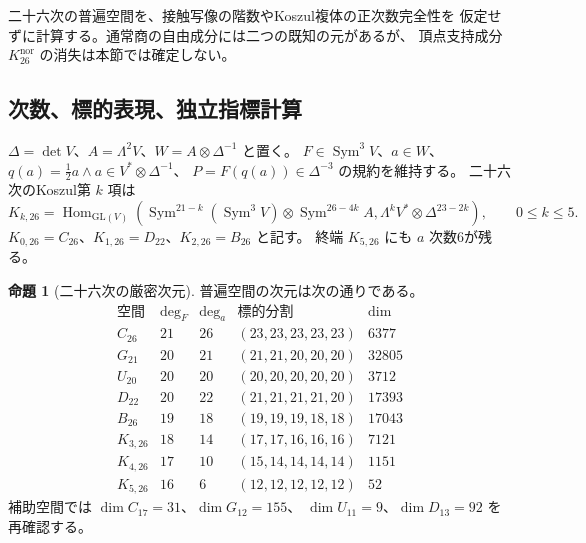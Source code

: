 \documentclass[a4paper,11pt]{ltjsarticle}
\theoremstyle{definition}
\newtheorem{proposition}[theorem]{命題}
\begin{document}
二十六次の普遍空間を、接触写像の階数やKoszul複体の正次数完全性を
仮定せずに計算する。通常商の自由成分には二つの既知の元があるが、
頂点支持成分 $K^{\mathrm{nor}}_{26}$ の消失は本節では確定しない。

\subsection{次数、標的表現、独立指標計算}

$\Delta=\det V$、$A=\Lambda^2V$、$W=A\otimes\Delta^{-1}$ と置く。
$F\in\operatorname{Sym}^3V$、$a\in W$、
$q(a)=\tfrac12a\wedge a\in V^*\otimes\Delta^{-1}$、
$P=F(q(a))\in\Delta^{-3}$ の規約を維持する。
二十六次のKoszul第 $k$ 項は
\[
 K_{k,26}=\operatorname{Hom}_{\mathrm{GL}(V)}
 \left(\operatorname{Sym}^{21-k}(\operatorname{Sym}^3V)
 \otimes\operatorname{Sym}^{26-4k}A,
 \Lambda^kV^*\otimes\Delta^{23-2k}\right),\qquad 0\leq k\leq5.
\]
$K_{0,26}=C_{26}$、$K_{1,26}=D_{22}$、$K_{2,26}=B_{26}$ と記す。
終端 $K_{5,26}$ にも $a$ 次数6が残る。

\begin{proposition}[二十六次の厳密次元]
\label{prop:v18-character-dimensions}
普遍空間の次元は次の通りである。
\[
\begin{array}{c|r|r|c|r}
\text{空間}&\deg_F&\deg_a&\text{標的分割}&\dim\\\hline
C_{26}&21&26&(23,23,23,23,23)&6377\\
G_{21}&20&21&(21,21,20,20,20)&32805\\
U_{20}&20&20&(20,20,20,20,20)&3712\\
D_{22}&20&22&(21,21,21,21,20)&17393\\
B_{26}&19&18&(19,19,19,18,18)&17043\\
K_{3,26}&18&14&(17,17,16,16,16)&7121\\
K_{4,26}&17&10&(15,14,14,14,14)&1151\\
K_{5,26}&16&6&(12,12,12,12,12)&52
\end{array}
\]
補助空間では $\dim C_{17}=31$、$\dim G_{12}=155$、
$\dim U_{11}=9$、$\dim D_{13}=92$ を再確認する。
\end{proposition}
\end{document}
